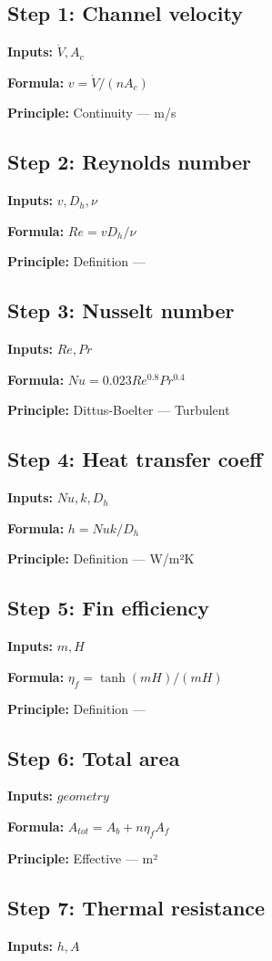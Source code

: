 \documentclass[11pt,twocolumn]{article}
\begin{document}
\subsection*{Step 1: Channel velocity}
\textbf{Inputs:} $\dot{V}, A_c$

\textbf{Formula:} $v = \dot{V} / (n A_c)$

\textbf{Principle:} Continuity --- m/s

\subsection*{Step 2: Reynolds number}
\textbf{Inputs:} $v, D_h, \nu$

\textbf{Formula:} $Re = v D_h / \nu$

\textbf{Principle:} Definition --- 

\subsection*{Step 3: Nusselt number}
\textbf{Inputs:} $Re, Pr$

\textbf{Formula:} $Nu = 0.023 Re^{0.8} Pr^{0.4}$

\textbf{Principle:} Dittus-Boelter --- Turbulent

\subsection*{Step 4: Heat transfer coeff}
\textbf{Inputs:} $Nu, k, D_h$

\textbf{Formula:} $h = Nu k / D_h$

\textbf{Principle:} Definition --- W/m²K

\subsection*{Step 5: Fin efficiency}
\textbf{Inputs:} $m, H$

\textbf{Formula:} $\eta_f = \tanh(mH)/(mH)$

\textbf{Principle:} Definition --- 

\subsection*{Step 6: Total area}
\textbf{Inputs:} $geometry$

\textbf{Formula:} $A_{tot} = A_b + n \eta_f A_f$

\textbf{Principle:} Effective --- m²

\subsection*{Step 7: Thermal resistance}
\textbf{Inputs:} $h, A$
\end{document}
